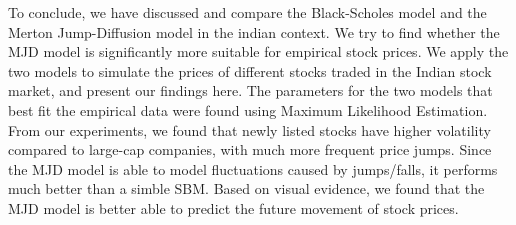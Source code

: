\documentclass[paper.tex]{subfiles}
\begin{document}
To conclude, we have discussed and compare the Black-Scholes model and the Merton Jump-Diffusion model in the indian context.
We try to find whether the MJD model is significantly more suitable for empirical stock prices. 
We apply the two models to simulate the prices of different stocks traded in the Indian stock market, and present our findings here. 
The parameters for the two models that best fit the empirical data were found using Maximum Likelihood Estimation.
From our experiments, we found that newly listed stocks have higher volatility compared to large-cap companies, with much more frequent price jumps.
Since the MJD model is able to model fluctuations caused by jumps/falls, it performs much better than a simble SBM.
Based on visual evidence, we found that the MJD model is better able to predict the future movement of stock prices.
\end{document}
